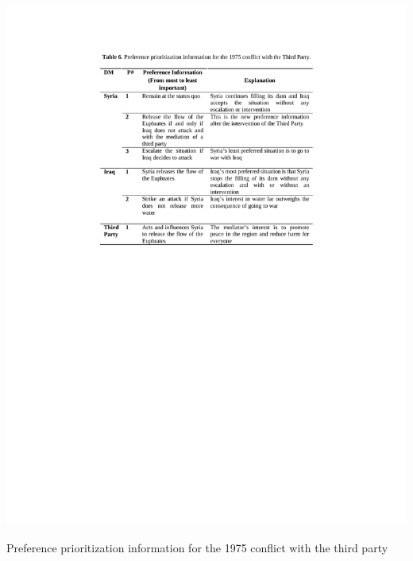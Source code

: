 \documentclass[letterpaper,12pt,titlepage,oneside,final]{book}
\begin{document}
\begin{table}[H]
\centering
\includegraphics[scale=1]{PDF-IMG/tables/6.pdf}

\caption{Preference prioritization information for the 1975 conflict with the third party}

\label{tbl:t6}
\end{table}
\end{document}
